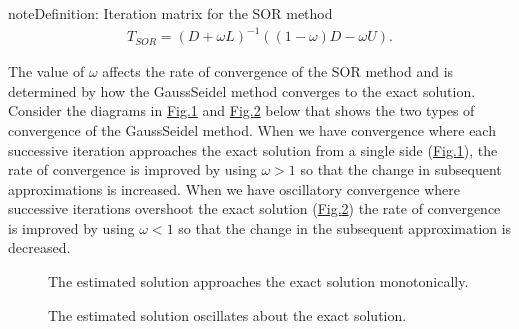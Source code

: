 \documentclass[letterpaper,10pt,english]{jupyterBook}
\begin{document}
\begin{sphinxadmonition}{note}{Definition: Iteration matrix for the SOR method}
\begin{equation}\label{equation:7_Indirect_methods/7.4_SOR_method:sor-method-iteration-matrix-equation}
\begin{split}T_{SOR} =(D+\omega L)^{-1} ((1-\omega )D-\omega U).\end{split}
\end{equation}\end{sphinxadmonition}

\sphinxAtStartPar
The value of \(\omega\) affects the rate of convergence of the SOR method and is determined by how the Gauss\sphinxhyphen{}Seidel method converges to the exact solution. Consider the diagrams in \hyperref[\detokenize{7_Indirect_methods/7.4_SOR_method:over-relaxation-figure}]{Fig.\@ \ref{\detokenize{7_Indirect_methods/7.4_SOR_method:over-relaxation-figure}}} and \hyperref[\detokenize{7_Indirect_methods/7.4_SOR_method:under-relaxation-figure}]{Fig.\@ \ref{\detokenize{7_Indirect_methods/7.4_SOR_method:under-relaxation-figure}}} below that shows the two types of convergence of the Gauss\sphinxhyphen{}Seidel method. When we have  convergence where each successive iteration approaches the exact solution from a single side (\hyperref[\detokenize{7_Indirect_methods/7.4_SOR_method:over-relaxation-figure}]{Fig.\@ \ref{\detokenize{7_Indirect_methods/7.4_SOR_method:over-relaxation-figure}}}), the rate of convergence is improved by using \(\omega > 1\) so that the change in subsequent approximations is increased. When we have oscillatory convergence where successive iterations overshoot the exact solution (\hyperref[\detokenize{7_Indirect_methods/7.4_SOR_method:under-relaxation-figure}]{Fig.\@ \ref{\detokenize{7_Indirect_methods/7.4_SOR_method:under-relaxation-figure}}}) the rate of convergence is improved by using \(\omega < 1\) so that the change in the subsequent approximation is decreased.

\begin{figure}[htbp]
\centering
\capstart

\noindent{}
\caption{The estimated solution approaches the exact solution monotonically.}\label{\detokenize{7_Indirect_methods/7.4_SOR_method:over-relaxation-figure}}\end{figure}

\begin{figure}[htbp]
\centering
\capstart

\noindent{}
\caption{The estimated solution oscillates about the exact solution.}\label{\detokenize{7_Indirect_methods/7.4_SOR_method:under-relaxation-figure}}\end{figure}
\end{document}
